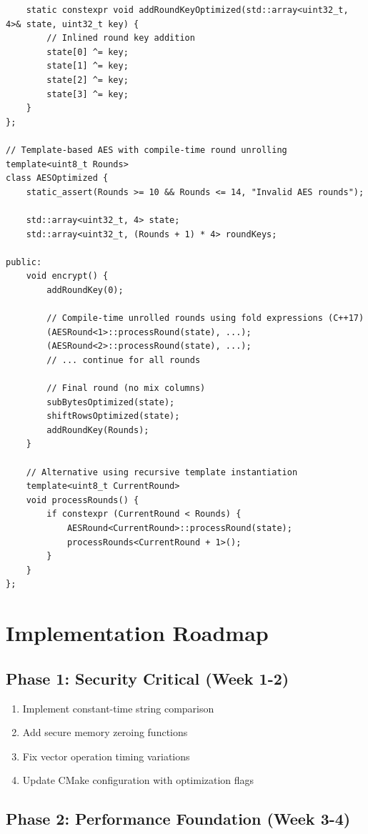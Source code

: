 \documentclass[11pt,a4paper]{article}
\begin{document}
\begin{lstlisting}
    static constexpr void addRoundKeyOptimized(std::array<uint32_t, 4>& state, uint32_t key) {
        // Inlined round key addition
        state[0] ^= key;
        state[1] ^= key;
        state[2] ^= key;
        state[3] ^= key;
    }
};

// Template-based AES with compile-time round unrolling
template<uint8_t Rounds>
class AESOptimized {
    static_assert(Rounds >= 10 && Rounds <= 14, "Invalid AES rounds");
    
    std::array<uint32_t, 4> state;
    std::array<uint32_t, (Rounds + 1) * 4> roundKeys;
    
public:
    void encrypt() {
        addRoundKey(0);
        
        // Compile-time unrolled rounds using fold expressions (C++17)
        (AESRound<1>::processRound(state), ...);
        (AESRound<2>::processRound(state), ...);
        // ... continue for all rounds
        
        // Final round (no mix columns)
        subBytesOptimized(state);
        shiftRowsOptimized(state);
        addRoundKey(Rounds);
    }
    
    // Alternative using recursive template instantiation
    template<uint8_t CurrentRound>
    void processRounds() {
        if constexpr (CurrentRound < Rounds) {
            AESRound<CurrentRound>::processRound(state);
            processRounds<CurrentRound + 1>();
        }
    }
};
\end{lstlisting}

\section{Implementation Roadmap}

\subsection{Phase 1: Security Critical (Week 1-2)}

\begin{enumerate}
    \item Implement constant-time string comparison
    \item Add secure memory zeroing functions
    \item Fix vector operation timing variations
    \item Update CMake configuration with optimization flags
\end{enumerate}

\subsection{Phase 2: Performance Foundation (Week 3-4)}
\end{document}
